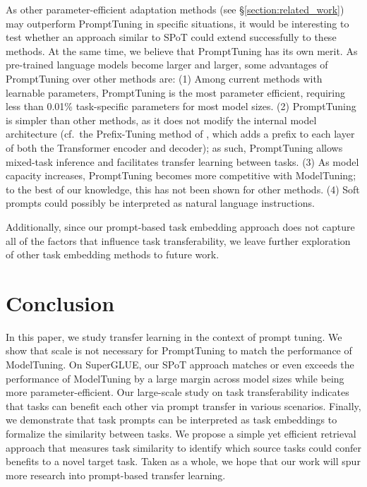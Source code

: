 As other parameter-efficient adaptation methods (see \S\ref{section:related_work}) may outperform {\small \sc PromptTuning} in specific situations, it would be interesting to test whether an approach similar to {{\small \sc SPoT}} could extend successfully to these methods. At the same time, we believe that {\small \sc PromptTuning} has its own merit. As pre-trained language models become larger and larger, some advantages of {\small \sc PromptTuning} over other methods are: (1) Among current methods with learnable parameters, {\small \sc PromptTuning} is the most parameter efficient, requiring less than 0.01\% task-specific parameters for most model sizes. (2) {\small \sc PromptTuning} is simpler than other methods, as it does not modify the internal model architecture (cf.~the {\small \sc Prefix-Tuning} method of \citet{XLi21}, which adds a prefix to each layer of both the Transformer encoder and decoder); as such, {\small \sc PromptTuning} allows mixed-task inference and facilitates transfer learning between tasks. (3) As model capacity increases, {\small \sc PromptTuning} becomes more competitive with {\small \sc ModelTuning}; to the best of our knowledge, this has not been shown for other methods. (4) Soft prompts could possibly be interpreted as natural language instructions.

Additionally, since our prompt-based task embedding approach does not capture all of the factors that influence task transferability, we leave further exploration of other task embedding methods to future work.

\section{Conclusion}
\label{section:conclusion}

In this paper, we study transfer learning in the context of prompt tuning. We show that scale is not necessary for {\small \sc PromptTuning} to match the performance of {\small \sc ModelTuning}. On {\small \sc SuperGLUE}, our {{\small \sc SPoT}} approach matches or even exceeds the performance of {\small \sc ModelTuning} by a large margin across model sizes while being more parameter-efficient. Our large-scale study on task transferability indicates that tasks can benefit each other via prompt transfer in various scenarios. Finally, we demonstrate that task prompts can be interpreted as task embeddings to formalize the similarity between tasks. We propose a simple yet efficient retrieval approach that measures task  similarity to identify which source tasks could confer benefits to a novel target task. Taken as a whole, we hope that our work will spur more research into prompt-based transfer learning.


